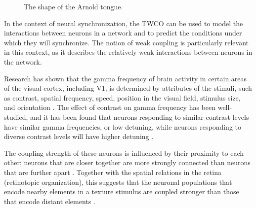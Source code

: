 \begin{figure}[!htp]
    \centering
    
    \caption[Arnold tongue shape]{The shape of the Arnold tongue.}
    \label{fig:arnold-tongue-example}
\end{figure}

In the context of neural synchronization, the TWCO can be used to model the interactions between neurons in a network and to predict the conditions under which they will synchronize. The notion of weak coupling is particularly relevant in this context, as it describes the relatively weak interactions between neurons in the network. 

Research has shown that the gamma frequency of brain activity in certain areas of the visual cortex, including V1, is determined by attributes of the stimuli, such as contrast, spatial frequency, speed, position in the visual field, stimulus size, and orientation \cite{Hubel1968, Kennedy1985, Gattass1987, Baldi1990, Whittington2000, Logothetis2001, Henrie2005, Hall2005, Buia2006, Gieselmann2008, Swettenham2009, Feng2010, Whittington2011, Roberts2013, Shapira2017, Dubey2020}. The effect of contrast on gamma frequency has been well-studied, and it has been found that neurons responding to similar contrast levels have similar gamma frequencies, or low detuning, while neurons responding to diverse contrast levels will have higher detuning \cite{Henrie2005, Ray2010, Roberts2013, Lowet2015, Hadjipapas2015, Shapira2017}.

The coupling strength of these neurons is influenced by their proximity to each other: neurons that are closer together are more strongly connected than neurons that are further apart \cite{Gilbert1983, Tso1986a, Stettler2002, Lowet2015, Lowet2017}. Together with the spatial relations in the retina (retinotopic organization), this suggests that the neuronal populations that encode nearby elements in a texture stimulus are coupled stronger than those that encode distant elements \cite{MaryamPLACEHOLDER}.